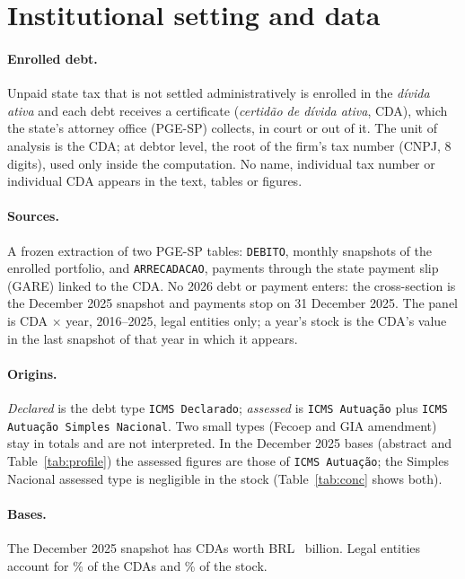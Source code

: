 \section{Institutional setting and data}\label{sec:data}

\paragraph{Enrolled debt.}
Unpaid state tax that is not settled administratively is enrolled in the \emph{d\'ivida ativa} and each debt receives a certificate (\emph{certid\~ao de d\'ivida ativa}, CDA), which the state's attorney office (PGE-SP) collects, in court or out of it.
The unit of analysis is the CDA; at debtor level, the root of the firm's tax number (CNPJ, 8 digits), used only inside the computation.
No name, individual tax number or individual CDA appears in the text, tables or figures.

\paragraph{Sources.}
A frozen extraction of two PGE-SP tables: \texttt{DEBITO}, monthly snapshots of the enrolled portfolio, and \texttt{ARRECADACAO}, payments through the state payment slip (GARE) linked to the CDA.
No 2026 debt or payment enters: the cross-section is the December 2025 snapshot and payments stop on 31 December 2025.
The panel is CDA $\times$ year, 2016--2025, legal entities only; a year's stock is the CDA's value in the last snapshot of that year in which it appears.

\paragraph{Origins.}
\emph{Declared} is the debt type \texttt{ICMS Declarado}; \emph{assessed} is \texttt{ICMS Autua\c{c}\~ao} plus \texttt{ICMS Autua\c{c}\~ao Simples Nacional}.
Two small types (Fecoep and GIA amendment) stay in totals and are not interpreted.
In the December 2025 bases (abstract and Table~\ref{tab:profile}) the assessed figures are those of \texttt{ICMS Autua\c{c}\~ao}; the Simples Nacional assessed type is negligible in the stock (Table~\ref{tab:conc} shows both).

\paragraph{Bases.}
The December 2025 snapshot has \nCdaVat{} \vat{} CDAs worth BRL~\stockVatBn{} billion.
Legal entities account for \pctCdaPj\% of the CDAs and \pctStockPj\% of the stock.

